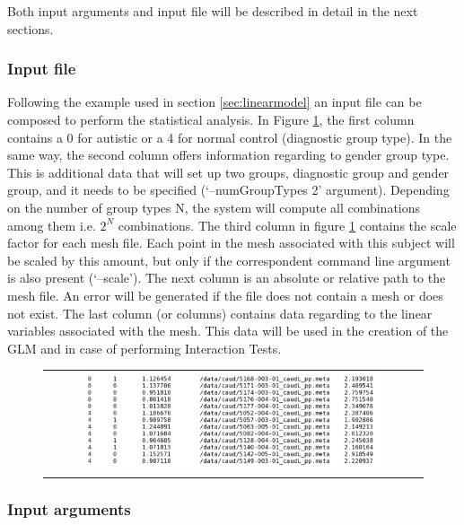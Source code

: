 \documentclass{InsightArticle}
\begin{document}
Both input arguments and input file will be described in detail in the next sections. 

\subsubsection{Input file}
\label{sec:ifile} 

Following the example used in section \ref{sec:linearmodel} an input file can be composed to perform the statistical analysis. In Figure \ref{fig:input}, the first column contains a 0 for autistic or a 4 for normal control (diagnostic group type). In the same way, the second column offers information regarding to gender group type. This is additional data that will set up two groups, diagnostic group and gender group, and it needs to be specified (`--numGroupTypes 2' argument). Depending on the number of group types N, the system will compute all combinations among them i.e. $2^N$ combinations. The third column in figure \ref{fig:input} contains the scale factor for each mesh file. Each point in the mesh associated with this subject will be scaled by this amount, but only if the correspondent command line argument is also present (`--scale'). The next column is an absolute or relative path to the mesh file. An error will be generated if the file does not contain a mesh or does not exist. The last column (or columns) contains data regarding to the linear variables associated with the mesh. This data will be used in the creation of the GLM and in case of performing Interaction Tests. 

\begin{figure}[htbp]
  \begin{center}
    \begin{tabular}[htbp]{c}
    \includegraphics[width=0.8\textwidth]{IJ_InputFile}
    \end{tabular}
   \label{fig:input}
  \end{center}
\end{figure}

\subsubsection{Input arguments}
\label{sec:iargs} 
\end{document}
